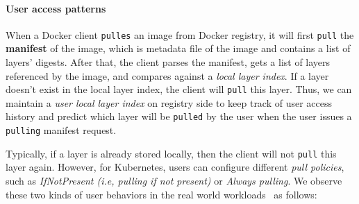 \paragraph{User access patterns} 
When a Docker client \texttt{pulles} an image from Docker registry,
it will first \texttt{pull} the \textbf{manifest} of the image, 
which is metadata file of the image and contains a list of layers' digests.
After that, the client parses the manifest, gets a list of layers referenced by the image,
and compares against a \emph{local layer index}.
If a layer doesn't exist in the local layer index,
 the client will \texttt{pull} this layer.
 Thus, we can maintain a \emph{user local layer index} on registry side to keep track of user access history
 and predict which layer will be \texttt{pulled} by the user when the user issues a \texttt{pulling} manifest request.

Typically, if a layer is already stored locally,
then the client will not \texttt{pull} this layer again.
However, for Kubernetes,
users can configure different \emph{pull policies}, 
such as \emph{IfNotPresent (i.e, pulling if not present)} or \emph{Always pulling}.
We observe these two kinds of user behaviors in the real world workloads~\cite{xxx} as follows:

